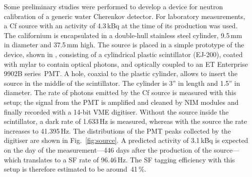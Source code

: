 Some preliminary studies were performed to develop a device for neutron calibration %
of a generic water Cherenkov detector.
For laboratory measurements, a Cf source with an activity of 4.3\,kBq at the time of its production was used.
The californium is encapsulated in a double-hull stainless steel cylinder, 9.5\,mm in diameter and 37.5\,mm high.
The source is placed in a simple prototype of the device, shown in , %
consisting of a cylindrical plastic scintillator (EJ-200), coated with mylar to contain optical photons, %
and optically coupled to an ET Enterprise 9902B series~PMT.
A hole, coaxial to the plastic cylinder, allows to insert the source in the middle of the scintillator.
The cylinder is 3'' in length and 1.5'' in diameter.
The rate of photons emitted by the Cf source is measured with this setup; %
the signal from the PMT is amplified and cleaned by NIM modules and finally recorded with a 14-bit VME digitiser.
Without the source inside the scintillator, a dark rate of 1.633\,Hz is measured, %
whereas with the source the rate increases to 41.395\,Hz.
The distributions of the PMT peaks collected by the digitiser are shown in Fig.~\ref{fig:source}.
A predicted activity of 3.1\,kBq is expected on the day of the measurement---446 days after the production of the source--- %
which translates to a SF rate of 96.46\,Hz.
The SF tagging efficiency with this setup is therefore estimated to be around~41\,\%.

